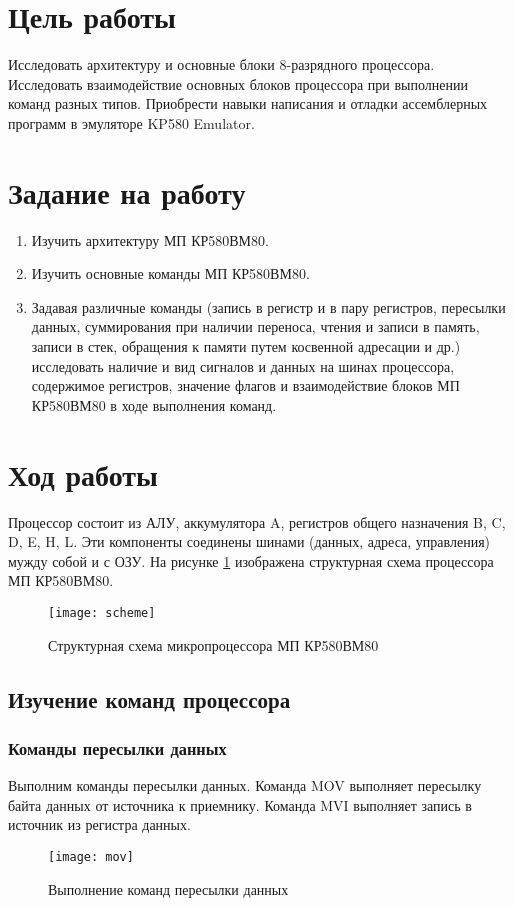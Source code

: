 \documentclass[a4paper,14pt]{extarticle}
\begin{document}

\section{Цель работы}
Исследовать архитектуру и основные блоки 8-разрядного процессора.
Исследовать взаимодействие основных блоков процессора при выполнении команд
разных типов. Приобрести навыки написания и отладки ассемблерных программ в
эмуляторе KP580 Emulator.

\section{Задание на работу}
\begin{enumerate}
    \item Изучить архитектуру МП КР580ВМ80.
    \item Изучить основные команды МП КР580ВМ80.
    \item Задавая различные команды (запись в регистр и в пару регистров,
    пересылки данных, суммирования при наличии переноса, чтения и записи в память,
    записи в стек, обращения к памяти путем косвенной адресации и др.) исследовать
    наличие и вид сигналов и данных на шинах процессора, содержимое регистров,
    значение флагов и взаимодействие блоков МП КР580ВМ80 в ходе выполнения команд.
\end{enumerate}

\section{Ход работы}
Процессор состоит из АЛУ, аккумулятора A, регистров общего назначения B, C, D, E, H, L.
Эти компоненты соединены шинами (данных, адреса, управления) мужду собой и с ОЗУ.
На рисунке \ref{fig:scheme} изображена структурная схема процессора МП КР580ВМ80.

\begin{figure}[H]
    \centering
    \texttt{[image: scheme]}
    \caption{Структурная схема микропроцессора МП КР580ВМ80}
    \label{fig:scheme}
\end{figure}

\subsection{Изучение команд процессора}
\subsubsection{Команды пересылки данных}
Выполним команды пересылки данных. Команда MOV выполняет пересылку байта данных от
источника к приемнику. Команда MVI выполняет запись в источник из регистра данных.
\begin{figure}[H]
    \centering
    \texttt{[image: mov]}
    \caption{Выполнение команд пересылки данных}
    \label{fig:mov}
\end{figure}
\end{document}
